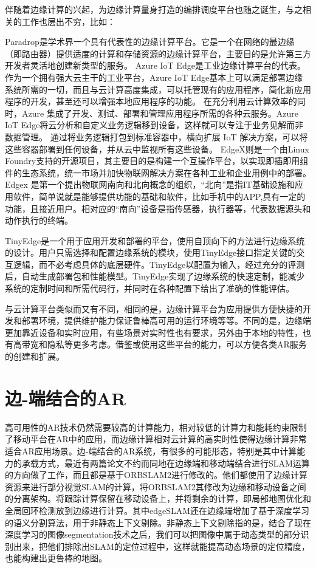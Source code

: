 伴随着边缘计算的兴起，为边缘计算量身打造的编排调度平台也随之诞生，与之相关的工作也层出不穷，比如：

Paradrop\cite{WilDasBan14,WilDasBan142,LiuWilBan16,Ban18}是学术界一个具有代表性的边缘计算平台。它是一个在网络的最边缘（即路由器）提供适度的计算和存储资源的边缘计算平台，主要目的是允许第三方开发者灵活地创建新类型的服务。
Azure IoT Edge\cite{AzureIoTEdge}是工业边缘计算平台的代表。作为一个拥有强大云主干的工业平台，Azure IoT Edge基本上可以满足部署边缘系统所需的一切，而且与云计算高度集成，可以托管现有的应用程序，简化新应用程序的开发，甚至还可以增强本地应用程序的功能。 在充分利用云计算效率的同时，Azure 集成了开发、测试、部署和管理应用程序所需的各种云服务。Azure IoT Edge将云分析和自定义业务逻辑移到设备，这样就可以专注于业务见解而非数据管理。 通过将业务逻辑打包到标准容器中，横向扩展 IoT 解决方案，可以将这些容器部署到任何设备，并从云中监视所有这些设备。
EdgeX\cite{EdgeXFoundry}则是一个由Linux Foundry支持的开源项目，其主要目的是构建一个互操作平台，以实现即插即用组件的生态系统，统一市场并加快物联网解决方案在各种工业和企业用例中的部署。Edgex 是第一个提出物联网南向和北向概念的组织，“北向”是指IT基础设施和应用软件，简单说就是能够提供功能的基础和软件，比如手机中的APP,具有一定的功能，且接近用户。相对应的“南向”设备是指传感器，执行器等，代表数据源头和动作执行的终端。

TinyEdge\cite{ZhaZhaFan20}是一个用于应用开发和部署的平台，使用自顶向下的方法进行边缘系统的设计。用户只需选择和配置边缘系统的模块，使用TinyEdge接口指定关键的交互逻辑，而不必考虑具体的底层硬件。TinyEdge以配置为输入，经过充分的评测后，自动生成部署包和性能模型。TinyEdge实现了边缘系统的快速定制，能减少系统的定制时间和所需代码行，并同时在各种配置下给出了准确的性能评估。

与云计算平台类似而又有不同，相同的是，边缘计算平台为应用提供方便快捷的开发和部署环境，提供维护能力保证鲁棒高可用的运行环境等等。不同的是，边缘端更加靠近设备和实时应用，有些场景对实时性也有要求，另外由于本地的特性，也有高带宽和隐私等更多考虑。借鉴或使用这些平台的能力，可以方便各类AR服务的创建和扩展。

\section{边-端结合的AR}
高可用性的AR技术仍然需要较高的计算能力，相对较低的计算力和能耗约束限制了移动平台在AR中的应用，而边缘计算相对云计算的高实时性使得边缘计算非常适合AR应用场景。边-端结合的AR系统，有很多的可能形态，特别是其中计算能力的承载方式，最近有两篇论文不约而同地在边缘端和移动端结合进行SLAM运算的方向做了工作，而且都是基于ORBSLAM2进行修改的。他们都使用了边缘计算资源来进行部分视觉SLAM的计算，将ORBSLAM2其修改为边缘和移动设备之间的分离架构。将跟踪计算保留在移动设备上，并将剩余的计算，即局部地图优化和全局回环检测放到边缘进行计算。其中edgeSLAM\cite{ben2020edge}还在边缘端增加了基于深度学习的语义分割算法，用于非静态上下文剔除。非静态上下文剔除指的是，结合了现在深度学习的图像segmentation技术之后，我们可以把图像中属于动态类型的部分识别出来，把他们排除出SLAM的定位过程中，这样就能提高动态场景的定位精度，也能构建出更鲁棒的地图。

